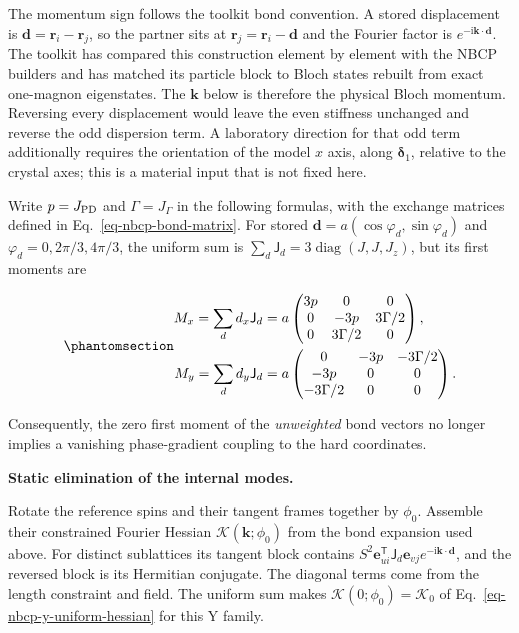 The momentum sign follows the toolkit bond convention. A stored
displacement is \(\mathbf d=\mathbf r_i-\mathbf r_j\), so the partner
sits at \(\mathbf r_j=\mathbf r_i-\mathbf d\) and the Fourier factor is
\(e^{-\mathrm i\mathbf k\cdot\mathbf d}\). The toolkit has compared this
construction element by element with the NBCP builders and has matched
its particle block to Bloch states rebuilt from exact one-magnon
eigenstates. The \(\mathbf k\) below is therefore the physical Bloch
momentum. Reversing every displacement would leave the even stiffness
unchanged and reverse the odd dispersion term. A laboratory direction
for that odd term additionally requires the orientation of the model
\(x\) axis, along \(\boldsymbol\delta_1\), relative to the crystal axes;
this is a material input that is not fixed here.

Write \(p=J_{\rm PD}\) and \(\Gamma=J_\Gamma\) in the following
formulas, with the exchange matrices defined in
Eq.~\ref{eq-nbcp-bond-matrix}. For stored
\(\mathbf d=a(\cos\varphi_d,\sin\varphi_d)\) and
\(\varphi_d=0,2\pi/3,4\pi/3\), the uniform sum is
\(\sum_d\mathsf J_d=3\operatorname{diag}(J,J,J_z)\), but its first
moments are

\begin{equation}\phantomsection\label{eq-nbcp-y-soc-first-moments}{
\begin{aligned}
M_x=\sum_d d_x\mathsf J_d
&=a\begin{pmatrix}3p&0&0\\0&-3p&3\Gamma/2\\0&3\Gamma/2&0\end{pmatrix},\\
M_y=\sum_d d_y\mathsf J_d
&=a\begin{pmatrix}0&-3p&-3\Gamma/2\\-3p&0&0\\-3\Gamma/2&0&0\end{pmatrix}.
\end{aligned}
}\end{equation}

Consequently, the zero first moment of the \emph{unweighted} bond
vectors no longer implies a vanishing phase-gradient coupling to the
hard coordinates.

\textbf{Static elimination of the internal modes.}

Rotate the reference spins and their tangent frames together by
\(\phi_0\). Assemble their constrained Fourier Hessian
\(\mathcal K(\mathbf k;\phi_0)\) from the bond expansion used above. For
distinct sublattices its tangent block contains
\(S^2\mathbf e_{u i}^{\mathsf T}\mathsf J_d\mathbf e_{v j}e^{-\mathrm i\mathbf k\cdot\mathbf d}\),
and the reversed block is its Hermitian conjugate. The diagonal terms
come from the length constraint and field. The uniform sum makes
\(\mathcal K(0;\phi_0)=\mathcal K_0\) of
Eq.~\ref{eq-nbcp-y-uniform-hessian} for this Y family.

